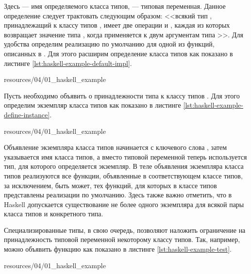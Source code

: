 Здесь  --- имя определяемого класса типов,  --- типовая переменная. Данное определение следует трактовать следующим образом: <<всякий тип , принадлежащий к классу типов , имеет две операции  и , каждая из которых возвращает значение типа , когда применяется к двум аргументам типа >>. Для удобства определим реализацию по умолчанию для одной из функций, описанных в . Для этого расширим определение класса типов как показано в листинге \ref{lst:haskell-example-default-impl}.


{resources/04/01_haskell_example}

Пусть необходимо объявить о принадлежности типа  к классу типов . Для этого определим экземпляр класса типов  как показано в листинге \ref{lst:haskell-example-define-instance}.


{resources/04/01_haskell_example}

Объявление экземпляра класса типов начинается с ключевого слова , затем указывается имя класса типов, а вместо типовой переменной  теперь используется тип, для которого определяется экземпляр. В теле объявления экземпляра класса типов реализуются все функции, объявленные в соответствующем классе типов, за исключением, быть может, тех функций, для которых в классе типов представлены реализации по умолчанию. Здесь также важно отметить, что в Haskell допускается существование не более одного экземпляра для всякой пары класса типов и конкретного типа. 

Специализированные типы, в свою очередь, позволяют наложить ограничение на принадлежность типовой переменной некоторому классу типов. Так, например, можно объявить функцию  как показано в листинге \ref{lst:haskell-example-test}. 


{resources/04/01_haskell_example}

